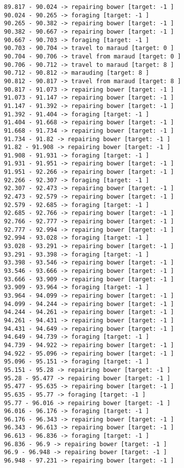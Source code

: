\documentclass[11pt]{article}
\begin{document}
\begin{Verbatim}[commandchars=\\\{\}]
89.817 - 90.024 -> repairing bower [target: -1 ]
90.024 - 90.265 -> foraging [target: -1 ]
90.265 - 90.382 -> repairing bower [target: -1 ]
90.382 - 90.667 -> repairing bower [target: -1 ]
90.667 - 90.703 -> foraging [target: -1 ]
90.703 - 90.704 -> travel to maraud [target: 0 ]
90.704 - 90.706 -> travel from maraud [target: 0 ]
90.706 - 90.712 -> travel to maraud [target: 8 ]
90.712 - 90.812 -> marauding [target: 8 ]
90.812 - 90.817 -> travel from maraud [target: 8 ]
90.817 - 91.073 -> repairing bower [target: -1 ]
91.073 - 91.147 -> repairing bower [target: -1 ]
91.147 - 91.392 -> repairing bower [target: -1 ]
91.392 - 91.404 -> foraging [target: -1 ]
91.404 - 91.668 -> repairing bower [target: -1 ]
91.668 - 91.734 -> repairing bower [target: -1 ]
91.734 - 91.82 -> repairing bower [target: -1 ]
91.82 - 91.908 -> repairing bower [target: -1 ]
91.908 - 91.931 -> foraging [target: -1 ]
91.931 - 91.951 -> repairing bower [target: -1 ]
91.951 - 92.266 -> repairing bower [target: -1 ]
92.266 - 92.307 -> foraging [target: -1 ]
92.307 - 92.473 -> repairing bower [target: -1 ]
92.473 - 92.579 -> repairing bower [target: -1 ]
92.579 - 92.685 -> foraging [target: -1 ]
92.685 - 92.766 -> repairing bower [target: -1 ]
92.766 - 92.777 -> repairing bower [target: -1 ]
92.777 - 92.994 -> repairing bower [target: -1 ]
92.994 - 93.028 -> foraging [target: -1 ]
93.028 - 93.291 -> repairing bower [target: -1 ]
93.291 - 93.398 -> foraging [target: -1 ]
93.398 - 93.546 -> repairing bower [target: -1 ]
93.546 - 93.666 -> repairing bower [target: -1 ]
93.666 - 93.909 -> repairing bower [target: -1 ]
93.909 - 93.964 -> foraging [target: -1 ]
93.964 - 94.099 -> repairing bower [target: -1 ]
94.099 - 94.244 -> repairing bower [target: -1 ]
94.244 - 94.261 -> repairing bower [target: -1 ]
94.261 - 94.431 -> repairing bower [target: -1 ]
94.431 - 94.649 -> repairing bower [target: -1 ]
94.649 - 94.739 -> foraging [target: -1 ]
94.739 - 94.922 -> repairing bower [target: -1 ]
94.922 - 95.096 -> repairing bower [target: -1 ]
95.096 - 95.151 -> foraging [target: -1 ]
95.151 - 95.28 -> repairing bower [target: -1 ]
95.28 - 95.477 -> repairing bower [target: -1 ]
95.477 - 95.635 -> repairing bower [target: -1 ]
95.635 - 95.77 -> foraging [target: -1 ]
95.77 - 96.016 -> repairing bower [target: -1 ]
96.016 - 96.176 -> foraging [target: -1 ]
96.176 - 96.343 -> repairing bower [target: -1 ]
96.343 - 96.613 -> repairing bower [target: -1 ]
96.613 - 96.836 -> foraging [target: -1 ]
96.836 - 96.9 -> repairing bower [target: -1 ]
96.9 - 96.948 -> repairing bower [target: -1 ]
96.948 - 97.231 -> repairing bower [target: -1 ]

\end{Verbatim}
\end{document}
